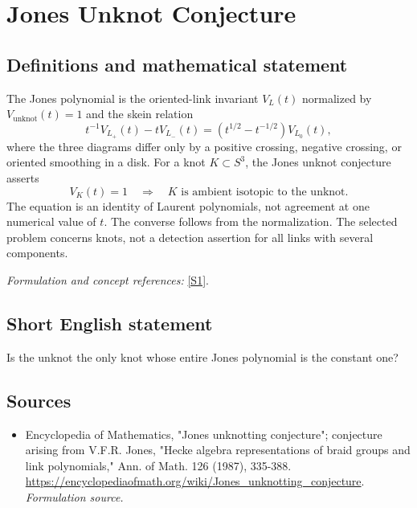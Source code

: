 \documentclass[11pt]{article}
\begin{document}
\section*{\texorpdfstring{Jones Unknot Conjecture}{Jones Unknot Conjecture}}\label{30006869}
\subsection{Definitions and mathematical statement}
The Jones polynomial is the oriented-link invariant $V_L(t)$ normalized by $V_{\mathrm{unknot}}(t)=1$ and the skein relation
\[
 t^{-1}V_{L_+}(t)-tV_{L_-}(t)
 =(t^{1/2}-t^{-1/2})V_{L_0}(t),
\]
where the three diagrams differ only by a positive crossing, negative crossing, or oriented smoothing in a disk. For a knot $K\subset S^3$, the Jones unknot conjecture asserts
\[
 V_K(t)=1\quad\Longrightarrow\quad K\text{ is ambient isotopic to the unknot}.
\]
The equation is an identity of Laurent polynomials, not agreement at one numerical value of $t$. The converse follows from the normalization. The selected problem concerns knots, not a detection assertion for all links with several components.
\par\smallskip\textit{Formulation and concept references:} \href{https://encyclopediaofmath.org/wiki/Jones_unknotting_conjecture}{[S1]}.

\subsection{Short English statement}
Is the unknot the only knot whose entire Jones polynomial is the constant one?
\subsection{Sources}
\begin{itemize}
\item[S1]Encyclopedia of Mathematics, "Jones unknotting conjecture"; conjecture arising from V.F.R. Jones, "Hecke algebra representations of braid groups and link polynomials," Ann. of Math. 126 (1987), 335-388.
\url{https://encyclopediaofmath.org/wiki/Jones_unknotting_conjecture}.
\textit{Formulation source.}
\end{itemize}
\end{document}
